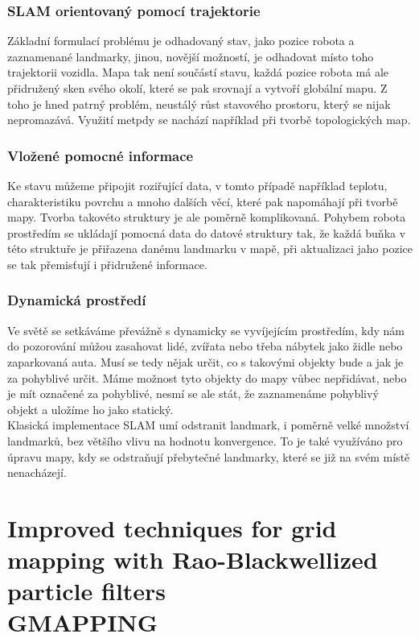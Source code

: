 \documentclass[11pt]{article}
\begin{document}
\subsubsection{SLAM orientovaný pomocí trajektorie}
Základní formulací problému je odhadovaný stav, jako pozice robota a zaznamenané landmarky, jinou, novější možností, je odhadovat místo toho trajektorii vozidla. Mapa tak není součástí stavu, každá pozice robota má ale přidružený sken svého okolí, které se pak srovnají a vytvoří globální mapu. Z toho je hned patrný problém, neustálý růst stavového prostoru, který se nijak nepromazává. Využití metpdy se nachází například při tvorbě topologických map.

\subsubsection{Vložené pomocné informace}
Ke stavu můžeme připojit roziřující data, v tomto případě například teplotu, charakteristiku povrchu a mnoho dalších věcí, které pak napomáhají při tvorbě mapy. Tvorba takovéto struktury je ale poměrně komplikovaná. Pohybem robota prostředím se ukládají pomocná data do datové struktury tak, že každá buňka v této struktuře je přiřazena danému landmarku v mapě, při aktualizaci jaho pozice se tak přemisťují i přidružené informace. 

\subsubsection{Dynamická prostředí}
Ve světě se setkáváme převážně s dynamicky se vyvíjejícím prostředím, kdy nám do pozorování můžou zasahovat lidé, zvířata nebo třeba nábytek jako židle nebo zaparkovaná auta. Musí se tedy nějak určit, co s takovými objekty bude a jak je za pohyblivé určit. Máme možnost tyto objekty do mapy vůbec nepřidávat, nebo je mít označené za pohyblivé, nesmí se ale stát, že zaznamenáme pohyblivý objekt a uložíme ho jako statický. \\
\indent Klasická implementace SLAM umí odstranit landmark, i poměrně velké množství landmarků, bez většího vlivu na hodnotu konvergence. To je také využíváno pro úpravu mapy, kdy se odstraňují přebytečné landmarky, které se již na svém místě nenacházejí. 

\newpage

\section{Improved techniques for grid mapping with Rao-Blackwellized particle filters\\GMAPPING}
\end{document}
